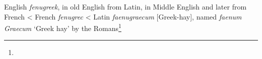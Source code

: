 \begin{etymology}\label{ety:fenugreek}
English \textit{fenugreek}, in old English from Latin, in Middle English and later from French
< French \textit{fenugrec}
< Latin \textit{faenugraecum} [Greek-hay], named \textit{faenum Graecum} `Greek hay' by the Romans\footnote{}
\end{etymology}